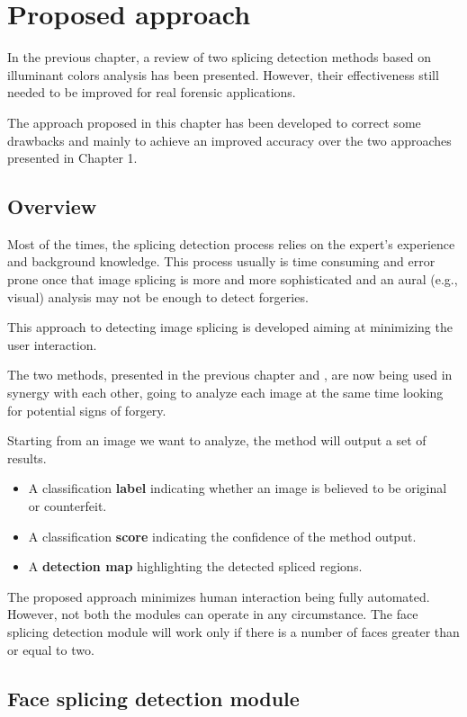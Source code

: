 \chapter{Proposed approach}

In the previous chapter, a review of two splicing detection methods based on illuminant colors analysis has been presented. However, their effectiveness still needed to be improved for real forensic applications.

The approach proposed in this chapter has been developed to correct some drawbacks and mainly to achieve an improved accuracy over the two approaches presented in Chapter 1. 

\section{Overview}

Most of the times, the splicing detection process relies on the expert's experience and background knowledge. This process usually is time consuming and error prone once that image splicing is more and more sophisticated and an aural (e.g., visual) analysis may not be enough to detect forgeries.

This approach to detecting image splicing is developed aiming at minimizing the user interaction. 

The two methods, presented in the previous chapter \cite{carvalho2016illuminant} and \cite{fan2015image}, are now being used in synergy with each other, going to analyze each image at the same time looking for potential signs of forgery.

Starting from an image we want to analyze, the method will output a set of results.
\begin{itemize}
\item A classification \textbf{label} indicating whether an image is believed to be original or counterfeit.
\item A classification \textbf{score} indicating the confidence of the method output.
\item A \textbf{detection map} highlighting the detected spliced regions.
\end{itemize}

The proposed approach minimizes human interaction being fully automated. However, not both the modules can operate in any circumstance. The face splicing detection module will work only if there is a number of faces greater than or equal to two.

\section{Face splicing detection module}

